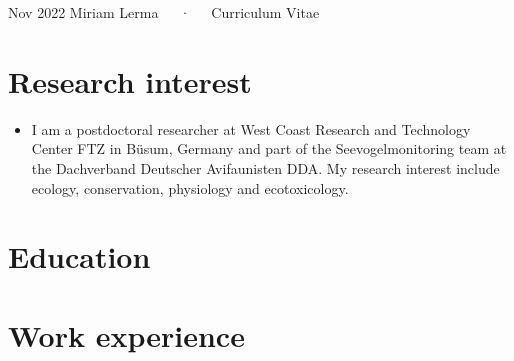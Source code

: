 \documentclass[11pt, a4paper]{awesome-cv}
\providecommand{\tightlist}{%
	\setlength{\itemsep}{0pt}\setlength{\parskip}{0pt}}
\begin{document}
\makecvheader

\makecvfooter
  {Nov 2022}
    {Miriam Lerma~~~·~~~Curriculum Vitae}
  {\thepage}





\hypertarget{research-interest}{%
\section{Research interest}\label{research-interest}}

\begin{itemize}
\tightlist
\item
  I am a postdoctoral researcher at West Coast Research and Technology
  Center FTZ in Büsum, Germany and part of the Seevogelmonitoring team
  at the Dachverband Deutscher Avifaunisten DDA. My research interest
  include ecology, conservation, physiology and ecotoxicology.
\end{itemize}

\hypertarget{education}{%
\section{Education}\label{education}}

\begin{cventries}
    \vspace{-4.0mm}
    \vspace{-4.0mm}
    \vspace{-4.0mm}
\end{cventries}

\hypertarget{work-experience}{%
\section{Work experience}\label{work-experience}}
\end{document}
